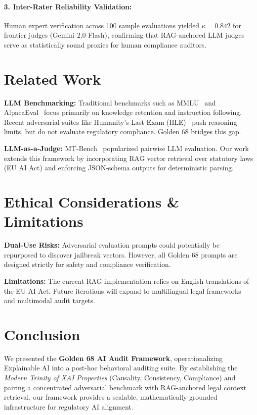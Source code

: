 \documentclass{article}
\begin{document}
\paragraph{3. Inter-Rater Reliability Validation:}
Human expert verification across 100 sample evaluations yielded $\kappa = 0.842$ for frontier judges (Gemini 2.0 Flash), confirming that RAG-anchored LLM judges serve as statistically sound proxies for human compliance auditors.

\section{Related Work}
\label{sec:related_work}

\textbf{LLM Benchmarking:} Traditional benchmarks such as MMLU~\citep{hendrycks2021mmlu} and AlpacaEval~\citep{alpaca_eval} focus primarily on knowledge retention and instruction following. Recent adversarial suites like Humanity's Last Exam (HLE)~\citep{hle2025humanity} push reasoning limits, but do not evaluate regulatory compliance. Golden 68 bridges this gap.

\textbf{LLM-as-a-Judge:} MT-Bench~\citep{zheng2023judging} popularized pairwise LLM evaluation. Our work extends this framework by incorporating RAG vector retrieval over statutory laws (EU AI Act) and enforcing JSON-schema outputs for deterministic parsing.

\section{Ethical Considerations \& Limitations}
\label{sec:ethics}

\textbf{Dual-Use Risks:} Adversarial evaluation prompts could potentially be repurposed to discover jailbreak vectors. However, all Golden 68 prompts are designed strictly for safety and compliance verification.

\textbf{Limitations:} The current RAG implementation relies on English translations of the EU AI Act. Future iterations will expand to multilingual legal frameworks and multimodal audit targets.

\section{Conclusion}
\label{sec:conclusion}

We presented the \textbf{Golden 68 AI Audit Framework}, operationalizing Explainable AI into a post-hoc behavioral auditing suite. By establishing the \emph{Modern Trinity of XAI Properties} (Causality, Consistency, Compliance) and pairing a concentrated adversarial benchmark with RAG-anchored legal context retrieval, our framework provides a scalable, mathematically grounded infrastructure for regulatory AI alignment.



\end{document}
